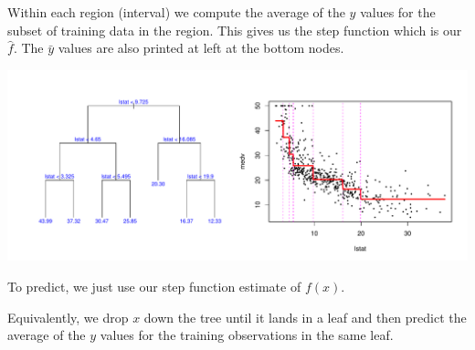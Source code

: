 \documentclass{beamer}
\newcommand{\sko}{\vspace{.1in}}
\begin{document}
\begin{frame}
\sko
Within each region (interval) we compute the average of the 
$y$ values for the subset of training data in the region.
This gives us the step function which is our $\hat{f}$. 
The $\bar{y}$ values are also printed at left at the bottom nodes.

\vspace{-.5in}

\begin{center}
\hspace*{-.5in} \includegraphics[scale=.4]{boston-lstat-simple-tree.pdf}
\end{center}

\vspace{-.3in}

To predict, we just use our step function estimate of $f(x)$.\sko

Equivalently, we drop $x$ down the tree until it lands in a leaf
and then predict the average of the $y$ values for the training observations
in the same leaf.\sko

\end{frame}
\end{document}
